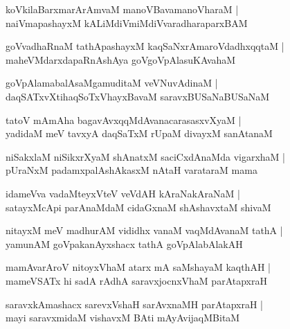 \documentclass[twoside,12pt,openright]{book}
\newcounter{shloka}[chapter]
\begin{document}
\begin{shloka}%
koVkilaBarxmarArAmvaM manoVBavamanoVharaM |\\
naiVmapashayxM kALiMdiVmiMdiVvaradharaparxBAM 
\end{shloka}

\begin{shloka}%
goVvadhaRnaM tathApashayxM kaqSaNxrAmaroVdadhxqqtaM |\\
maheVMdarxdapaRnAshAya goVgoVpAlasuKAvahaM 
\end{shloka}

\begin{shloka}%
goVpAlamabalAsaMgamuditaM veVNuvAdinaM |\\
daqSATxvXtihaqSoTxVhayxBavaM saravxBUSaNaBUSaNaM 
\end{shloka}

\begin{shloka}%
tatoV mAmAha bagavAvxqqMdAvanacarasasxvXyaM |\\
yadidaM meV tavxyA daqSaTxM rUpaM divayxM sanAtanaM 
\end{shloka}

\begin{shloka}%
niSakxlaM niSikxrXyaM shAnatxM saciCxdAnaMda vigarxhaM |\\
pUraNxM padamxpalAshAkasxM nAtaH varataraM mama 
\end{shloka}

\begin{shloka}%
idameVva vadaMteyxVteV veVdAH kAraNakAraNaM |\\
satayxMcApi parAnaMdaM cidaGxnaM shAshavxtaM shivaM 
\end{shloka}

\begin{shloka}%
nitayxM meV madhurAM vididhx vanaM vaqMdAvanaM tathA |\\
yamunAM goVpakanAyxshacx tathA goVpAlabAlakAH
\end{shloka}

\begin{shloka}%
mamAvarAroV nitoyxVhaM atarx mA saMshayaM kaqthAH |\\
mameVSATx hi sadA rAdhA saravxjocnxVhaM parAtapxraH 
\end{shloka}

\begin{shloka}%
saravxkAmashacx sarevxVshaH sarAvxnaMH parAtapxraH |\\
mayi saravxmidaM vishavxM BAti mAyAvijaqMBitaM 
\end{shloka}
\end{document}
